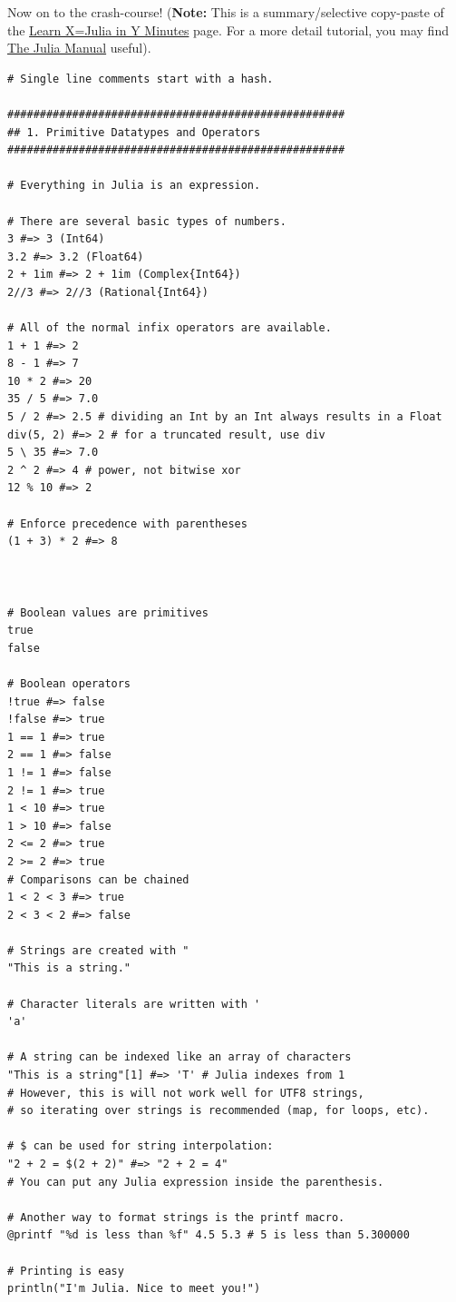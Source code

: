 \documentclass[11pt,a4paper,oneside]{report}
\begin{document}
Now on to the crash-course! ({\bf Note:} This is a summary/selective copy-paste of the \href{http://learnxinyminutes.com/docs/julia/}{Learn X=Julia in Y Minutes} page. For a more detail tutorial, you may find \href{http://docs.julialang.org/en/release-0.2/manual/}{The Julia Manual} useful).
\begin{verbatim}
# Single line comments start with a hash.

####################################################
## 1. Primitive Datatypes and Operators
####################################################

# Everything in Julia is an expression.

# There are several basic types of numbers.
3 #=> 3 (Int64)
3.2 #=> 3.2 (Float64)
2 + 1im #=> 2 + 1im (Complex{Int64})
2//3 #=> 2//3 (Rational{Int64})

# All of the normal infix operators are available.
1 + 1 #=> 2
8 - 1 #=> 7
10 * 2 #=> 20
35 / 5 #=> 7.0
5 / 2 #=> 2.5 # dividing an Int by an Int always results in a Float
div(5, 2) #=> 2 # for a truncated result, use div
5 \ 35 #=> 7.0
2 ^ 2 #=> 4 # power, not bitwise xor
12 % 10 #=> 2

# Enforce precedence with parentheses
(1 + 3) * 2 #=> 8



# Boolean values are primitives
true
false

# Boolean operators
!true #=> false
!false #=> true
1 == 1 #=> true
2 == 1 #=> false
1 != 1 #=> false
2 != 1 #=> true
1 < 10 #=> true
1 > 10 #=> false
2 <= 2 #=> true
2 >= 2 #=> true
# Comparisons can be chained
1 < 2 < 3 #=> true
2 < 3 < 2 #=> false

# Strings are created with "
"This is a string."

# Character literals are written with '
'a'

# A string can be indexed like an array of characters
"This is a string"[1] #=> 'T' # Julia indexes from 1
# However, this is will not work well for UTF8 strings,
# so iterating over strings is recommended (map, for loops, etc).

# $ can be used for string interpolation:
"2 + 2 = $(2 + 2)" #=> "2 + 2 = 4"
# You can put any Julia expression inside the parenthesis.

# Another way to format strings is the printf macro.
@printf "%d is less than %f" 4.5 5.3 # 5 is less than 5.300000

# Printing is easy
println("I'm Julia. Nice to meet you!")



\end{verbatim}
\end{document}
